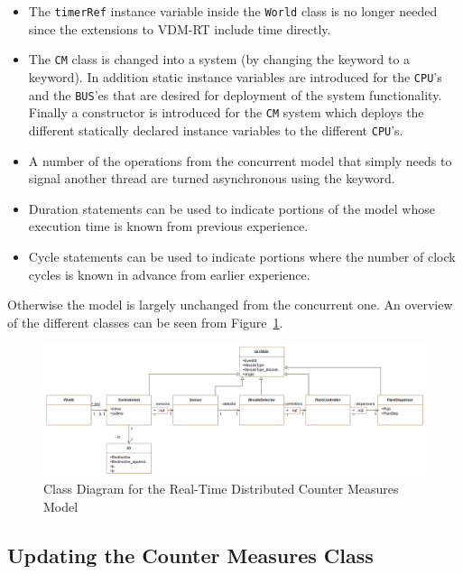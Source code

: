 \documentclass{overturerepchap}
\begin{document}
\begin{itemize}
\item The \texttt{timerRef} instance
  variable inside the \texttt{World} class is no longer needed since
  the extensions to VDM-RT include time directly.
\item The \texttt{CM} class is changed into a system (by changing the
{\bf{}} keyword to a {\bf{}} keyword). In addition
static instance variables are introduced for the \texttt{CPU}'s and the
\texttt{BUS}'es that are desired for deployment of the system functionality.
Finally a constructor is introduced for the \texttt{CM} system which deploys
the different statically declared instance variables to the different 
\texttt{CPU}'s.
\item A number of the operations from the concurrent model that simply
  needs to signal another thread are turned asynchronous using the
  {\bf{}} keyword.
\item Duration statements can be used to indicate portions of the model
whose execution time is known from previous experience.
\item Cycle statements can be used to indicate portions where the number 
of clock cycles is known in advance from earlier experience.
\end{itemize}

Otherwise the model is largely unchanged from the concurrent one. An
overview of the different classes can be seen from
Figure~\ref{fig:classdiagvice}.

\begin{figure}
\begin{center}
\includegraphics[width=6in]{figures/viceCMclassdiag.png}
\end{center}
\caption{Class Diagram for the Real-Time Distributed Counter Measures Model\label{fig:classdiagvice}}
\end{figure}

\subsection{Updating the Counter Measures Class}
\end{document}
